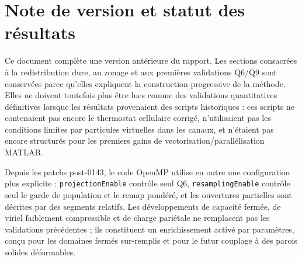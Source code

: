 \documentclass[11pt,a4paper]{article}
\begin{document}
\begin{abstract}
Le dernier cycle expérimental de surface libre a ensuite cherché à corriger le déficit Taylor--Culick par des fermetures thermiques et de rétention plus agressives. Les branches x13r--x13x (refroidissement de cellule d'interface, refroidissement anisotrope, loi progressive x13t, rétention one-for-one, absorption/reseed x13w et rétention probabiliste) ont permis d'augmenter fortement $G_{\rm TC}$, jusqu'à des valeurs proches de l'unité sur une grille affinée. La validation croisée par gouttes oscillantes a cependant montré que la fermeture x13t+x13w contracte artificiellement le support de phase et détruit la dynamique capillaire, surtout sur la grille fine. Ces développements sont donc conservés comme résultats négatifs documentés, mais exclus du chemin de production. Le point de référence surface libre est figé au commit \texttt{7655b81b1b2fd16eecefa8d8b3bebac4cd9f87f1}, tag \texttt{surf-tension-qualified-x13h-20260831}, avec la chaîne x10o+CIC+Q2+x10p/q+x10u+x10v full-vector swap+x12a. Une revalidation après retour exact au dépôt donne $G_{\omega,n=2}=1.00151$ et $G_{\rm TC}=0.79457$ à $\sigma=10000$.

\end{abstract}


\tableofcontents


\section*{Note de version et statut des résultats}

Ce document complète une version antérieure du rapport. Les sections consacrées à la redistribution dure, au zonage et aux premières validations Q6/Q9 sont conservées parce qu'elles expliquent la construction progressive de la méthode. Elles ne doivent toutefois plus être lues comme des validations quantitatives définitives lorsque les résultats provenaient des scripts historiques : ces scripts ne contenaient pas encore le thermostat cellulaire corrigé, n'utilisaient pas les conditions limites par particules virtuelles dans les canaux, et n'étaient pas encore structurés pour les premiers gains de vectorisation/parallélisation MATLAB.



Depuis les patchs post-0143, le code OpenMP utilise en outre une configuration plus explicite : \texttt{projectionEnable} contrôle seul Q6, \texttt{resamplingEnable} contrôle seul le garde de population et le remap pondéré, et les ouvertures partielles sont décrites par des segments relatifs. Les développements de capacité fermée, de viriel faiblement compressible et de charge pariétale ne remplacent pas les validations précédentes ; ils constituent un enrichissement activé par paramètres, conçu pour les domaines fermés sur-remplis et pour le futur couplage à des parois solides déformables.
\end{document}
